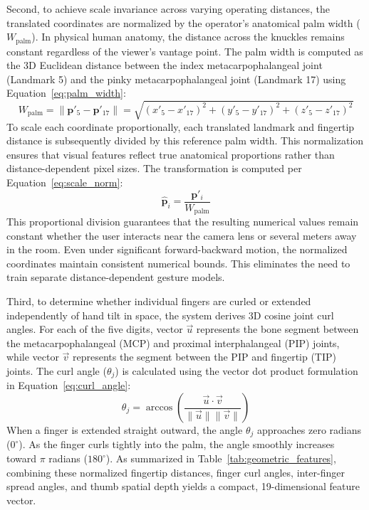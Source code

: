 Second, to achieve scale invariance across varying operating distances, the translated coordinates are normalized by the operator's anatomical palm width ($W_{\text{palm}}$). In physical human anatomy, the distance across the knuckles remains constant regardless of the viewer's vantage point. The palm width is computed as the 3D Euclidean distance between the index metacarpophalangeal joint (Landmark 5) and the pinky metacarpophalangeal joint (Landmark 17) using Equation~\eqref{eq:palm_width}:
\begin{equation}
\label{eq:palm_width}
W_{\text{palm}} = \|\mathbf{p}'_5 - \mathbf{p}'_{17}\| = \sqrt{(x'_5 - x'_{17})^2 + (y'_5 - y'_{17})^2 + (z'_5 - z'_{17})^2}
\end{equation}
To scale each coordinate proportionally, each translated landmark and fingertip distance is subsequently divided by this reference palm width. This normalization ensures that visual features reflect true anatomical proportions rather than distance-dependent pixel sizes. The transformation is computed per Equation~\eqref{eq:scale_norm}:
\begin{equation}
\label{eq:scale_norm}
\hat{\mathbf{p}}_i = \frac{\mathbf{p}'_i}{W_{\text{palm}}}
\end{equation}
This proportional division guarantees that the resulting numerical values remain constant whether the user interacts near the camera lens or several meters away in the room. Even under significant forward-backward motion, the normalized coordinates maintain consistent numerical bounds. This eliminates the need to train separate distance-dependent gesture models.

Third, to determine whether individual fingers are curled or extended independently of hand tilt in space, the system derives 3D cosine joint curl angles. For each of the five digits, vector $\vec{u}$ represents the bone segment between the metacarpophalangeal (MCP) and proximal interphalangeal (PIP) joints, while vector $\vec{v}$ represents the segment between the PIP and fingertip (TIP) joints. The curl angle ($\theta_j$) is calculated using the vector dot product formulation in Equation~\eqref{eq:curl_angle}:
\begin{equation}
\label{eq:curl_angle}
\theta_j = \arccos\left(\frac{\vec{u} \cdot \vec{v}}{\|\vec{u}\| \|\vec{v}\|}\right)
\end{equation}
When a finger is extended straight outward, the angle $\theta_j$ approaches zero radians ($0^\circ$). As the finger curls tightly into the palm, the angle smoothly increases toward $\pi$ radians ($180^\circ$). As summarized in Table~\ref{tab:geometric_features}, combining these normalized fingertip distances, finger curl angles, inter-finger spread angles, and thumb spatial depth yields a compact, 19-dimensional feature vector.

